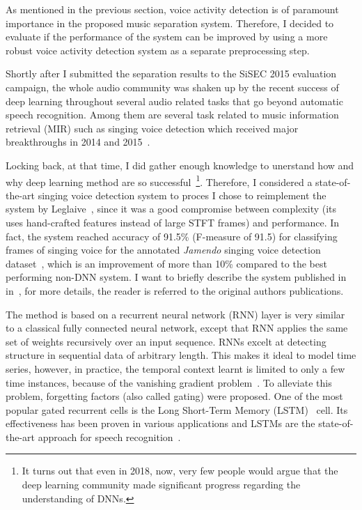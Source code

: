 As mentioned in the previous section, voice activity detection is of paramount importance in the proposed music separation system.
Therefore, I decided to evaluate if the performance of the system can be improved by using a more robust voice activity detection system as a separate preprocessing step.
\par
Shortly after I submitted the separation results to the SiSEC 2015 evaluation campaign, the whole audio community was shaken up by the recent success of deep learning throughout several audio related tasks that go beyond automatic speech recognition.
Among them are several task related to music information retrieval (MIR) such as singing voice detection which received major breakthroughs in 2014 and 2015~\cite{Lehner14, Lehner15, Leglaive15, schlueter15}.
\par
Locking back, at that time, I did gather enough knowledge to unerstand how and why deep learning method are so successful~\footnote{It turns out that even in 2018, now, very few people would argue that the deep learning community made significant progress regarding the understanding of DNNs.}.
Therefore, I considered a state-of-the-art singing voice detection system to proces
I chose to reimplement the system by Leglaive~\cite{Leglaive15}, since it was a good compromise between complexity (its uses hand-crafted features instead of large STFT frames) and performance.
In fact, the system reached accuracy of 91.5\% (F-measure of 91.5) for classifying frames of singing voice for the annotated \emph{Jamendo} singing voice detection dataset~\cite{ramona08}, which is an improvement of more than 10\% compared to the best performing non-DNN system.
I want to briefly describe the system published in in~\cite{Leglaive15}, for more details, the reader is referred to the original authors publications.
\par
The method is based on a recurrent neural network (RNN) layer is very similar to a classical fully connected neural network, except that RNN applies the same set of weights recursively over an input sequence.
RNNs excelt at detecting structure in sequential data of arbitrary length.
This makes it ideal to model time series, however, in practice, the temporal context learnt is limited to only a few time instances, because of the vanishing gradient problem~\cite{Hochreiter98}.
To alleviate this problem, forgetting factors (also called gating) were proposed.
One of the most popular gated recurrent cells is the Long Short-Term Memory (LSTM)~\cite{Hochreiter97} cell.
Its effectiveness has been proven in various applications and LSTMs are the state-of-the-art approach for speech recognition~\cite{Graves13}.
